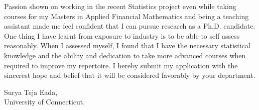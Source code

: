 \documentclass[12pt]{article}
\begin{document}
Passion shown on working in the recent Statistics project even while taking courses for my Masters in Applied Financial Mathematics and being a teaching assistant made me feel confident that I can pursue research as a Ph.D. candidate. One thing I have learnt from exposure to industry is to be able to self assess reasonably. When I assessed myself, I found that I have the necessary statistical knowledge and the ability and dedication to take more advanced courses when required to improve my repertoire. I hereby submit my application with the sincerest hope and belief that it will be considered favorably by your department. \\




\begin{flushleft}

Surya Teja Eada,  \\
University of Connecticut. \\

\end{flushleft}
\end{document}
